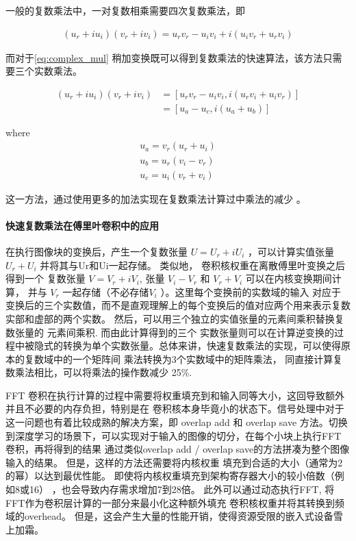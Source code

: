 一般的复数乘法中，一对复数相乘需要四次复数乘法，即

\begin{align}
\label{eq:complex_mul}
(u_r + i u_i)(v_r + i v_i) = u_r v_r - u_i v_i + i ( u_i v_r + u_r v_i )
\end{align}

而对于\ref{eq:complex_mul} 稍加变换既可以得到复数乘法的快速算法，该方法只需要三个实数乘法。

\begin{align}
\label{eq:complex_mul_fast}
  (u_r + i u_i) (v_r + i v_i) &= [ u_r v_r - u_i v_i, i(u_r v_i + u_i v_r)]\\
                               &= [ u_a - u_c,i( u_a + u_b) ]
\end{align}

where 
\begin{align}
u_a = v_r ( u_r + u_i )\\
u_b = u_r ( v_i - v_r )\\
u_c = u_i ( v_r + v_i )
\end{align}

这一方法，通过使用更多的加法实现在复数乘法计算过中乘法的减少 。

\paragraph{快速复数乘法在傅里叶卷积中的应用}

在执行图像块的变换后，产生一个复数张量 $U = U_r + i U_i$ ，可以计算实值张量 $U_r + U_i$ 并将其与Ur和Ui一起存储。 类似地， 卷积核权重在离散傅里叶变换之后得到一个
复数张量 $V = V_r + i V_i $, 张量 $V_i - V_r$ 和 $V_r + V_i$ 可以在内核变换期间计算， 并与 $V_r$ 一起存储（不必存储$V_i$ ）。这里每个变换前的实数域的输入
对应于变换后的三个实数值，而不是直观理解上的每个变换后的值对应两个用来表示复数实部和虚部的两个实数。 然后，可以用三个独立的实值张量的元素间乘积替换复数张量的
元素间乘积. 而由此计算得到的三个 实数张量则可以在计算逆变换的过程中被隐式的转换为单个实数张量。总体来讲，快速复数乘法的实现，可以使得原本的复数域中的一个矩阵间
乘法转换为3个实数域中的矩阵乘法， 同直接计算复数乘法相比，可以将乘法的操作数减少 25\%.

FFT 卷积在执行计算的过程中需要将权重填充到和输入同等大小，这回导致额外并且不必要的内存负担，特别是在
卷积核本身毕竟小的状态下。信号处理中对于这一问题也有着比较成熟的解决方案，即 overlap add 和 overlap save
方法。切换到深度学习的场景下，可以实现对于输入的图像的切分，在每个小块上执行FFT 卷积，再将得到的结果
通过类似overlap add / overlap save的方法拼凑为整个图像输入的结果。 但是，这样的方法还需要将内核权重
填充到合适的大小（通常为2的幂）以达到最优性能。 即使将内核权重填充到架构寄存器大小的较小倍数（例如8或16）
，也会导致内存需求增加7到28倍。 此外可以通过动态执行FFT, 将FFT作为卷积层计算的一部分来最小化这种额外填充
卷积核权重并将其转换到频域的overhead。 但是，这会产生大量的性能开销，使得资源受限的嵌入式设备雪上加霜。


